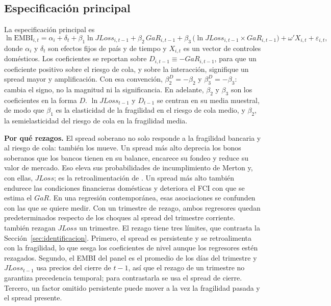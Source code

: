 \subsection{Especificación principal}
\label{sec:est-principal}

La especificación principal es
\begin{equation}
\ln\mathrm{EMBI}_{i,t}=\alpha_i+\delta_t+\beta_1\ln JLoss_{i,t-1}+\beta_2\,GaR_{i,t-1}+\beta_3\,\bigl(\ln JLoss_{i,t-1}\times GaR_{i,t-1}\bigr)+\omega'X_{i,t}+\varepsilon_{i,t},
\label{eq:principal}
\end{equation}
donde $\alpha_i$ y $\delta_t$ son efectos fijos de país y de tiempo y $X_{i,t}$ es un vector de controles domésticos. Los coeficientes se reportan sobre $D_{i,t-1}\equiv-GaR_{i,t-1}$, para que un coeficiente positivo sobre el riesgo de cola, y sobre la interacción, signifique un spread mayor y amplificación. Con esa convención, $\beta_2^D=-\beta_2$ y $\beta_3^D=-\beta_3$: cambia el signo, no la magnitud ni la significancia. En adelante, $\beta_2$ y $\beta_3$ son los coeficientes en la forma $D$. $\ln JLoss_{t-1}$ y $D_{t-1}$ se centran en su media muestral, de modo que $\beta_1$ es la elasticidad de la fragilidad en el riesgo de cola medio, y $\beta_2$, la semielasticidad del riesgo de cola en la fragilidad media.

\textbf{Por qué rezagos.} El spread soberano no solo responde a la fragilidad bancaria y al riesgo de cola: también los mueve. Un spread más alto deprecia los bonos soberanos que los bancos tienen en su balance, encarece su fondeo y reduce su valor de mercado. Eso eleva sus probabilidades de incumplimiento de Merton y, con ellas, $JLoss$; es la retroalimentación de \citet{FarhiTirole2018b}. Un spread más alto también endurece las condiciones financieras domésticas y deteriora el FCI con que se estima el $GaR$. En una regresión contemporánea, esas asociaciones se confunden con las que se quiere medir. Con un trimestre de rezago, ambos regresores quedan predeterminados respecto de los choques al spread del trimestre corriente. \citet{Chari2024b} también rezagan $JLoss$ un trimestre. El rezago tiene tres límites, que contrasta la Sección~\ref{sec:identificacion}. Primero, el spread es persistente y se retroalimenta con la fragilidad, lo que sesga los coeficientes de nivel aunque los regresores estén rezagados. Segundo, el EMBI del panel es el promedio de los días del trimestre y $JLoss_{t-1}$ usa precios del cierre de $t-1$, así que el rezago de un trimestre no garantiza precedencia temporal; para contrastarla se usa el spread de cierre. Tercero, un factor omitido persistente puede mover a la vez la fragilidad pasada y el spread presente.

